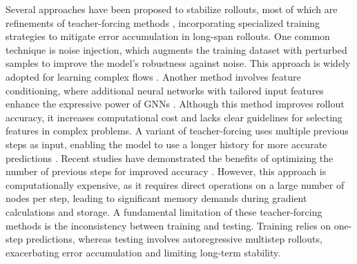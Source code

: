 \documentclass{article}
\begin{document}
Several approaches have been proposed to stabilize rollouts, most of which are refinements of teacher-forcing methods \cite{lamb2016professor}, incorporating specialized training strategies to mitigate error accumulation in long-span rollouts. One common technique is noise injection, which augments the training dataset with perturbed samples to improve the model's robustness against noise. This approach is widely adopted for learning complex flows \cite{pfaff2020learning,allen2022physical,sanchez2020learning}. Another method involves feature conditioning, where additional neural networks with tailored input features enhance the expressive power of GNNs \cite{xu2021conditionally}. Although this method improves rollout accuracy, it increases computational cost and lacks clear guidelines for selecting features in complex problems. A variant of teacher-forcing uses multiple previous steps as input, enabling the model to use a longer history for more accurate predictions \cite{pfaff2020learning,geneva2020modeling}. Recent studies have demonstrated the benefits of optimizing the number of previous steps for improved accuracy \cite{pfaff2020learning}. However, this approach is computationally expensive, as it requires direct operations on a large number of nodes per step, leading to significant memory demands during gradient calculations and storage. A fundamental limitation of these teacher-forcing methods is the inconsistency between training and testing. Training relies on one-step predictions, whereas testing involves autoregressive multistep rollouts, exacerbating error accumulation and limiting long-term stability.
\end{document}

